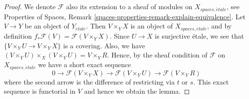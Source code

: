 \documentclass[10pt,a4paper]{amsart}
\theoremstyle{plain}
\theoremstyle{definition}
\theoremstyle{remark}
\numberwithin{equation}{subsection}
\def\etale{{\acute{e}tale}}
\begin{document}
\begin{proof}
We denote $\mathcal{F}$ also its extension to a sheaf of modules on
$X_{spaces, \etale}$, see
Properties of Spaces,
Remark \ref{spaces-properties-remark-explain-equivalence}.
Let $V \to Y$ be an object of $Y_\etale$. Then $V \times_Y X$ is an
object of $X_{spaces, \etale}$, and by definition
$f_*\mathcal{F}(V) = \mathcal{F}(V \times_Y X)$. Since $U \to X$ is
surjective \'etale, we see that $\{V \times_Y U \to V \times_Y X\}$
is a covering. Also, we have
$(V \times_Y U) \times_X (V \times_Y U) = V \times_Y R$.
Hence, by the sheaf condition of $\mathcal{F}$ on
$X_{spaces, \etale}$ we have a short exact sequence
$$
0 \to \mathcal{F}(V \times_Y X)
\to \mathcal{F}(V \times_Y U) \to \mathcal{F}(V \times_Y R)
$$
where the second arrow is the difference of restricting via $t$ or $s$.
This exact sequence is functorial in $V$ and hence we obtain the lemma.
\end{proof}
\end{document}
